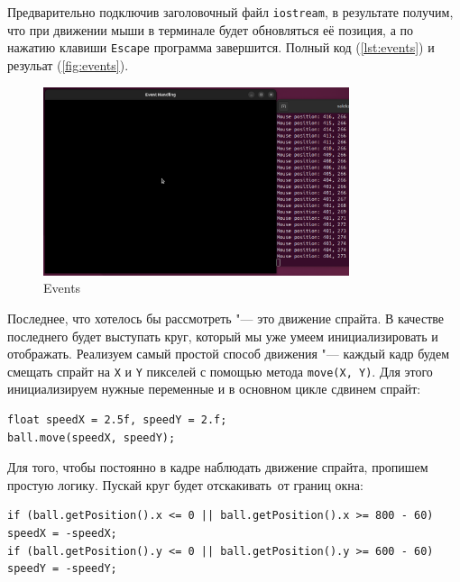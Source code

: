 Предварительно подключив заголовочный файл \texttt{iostream}, в результате получим, что при движении мыши в терминале будет обновляться её позиция, а по нажатию клавиши \texttt{Escape} программа завершится. Полный код (\autoref{lst:events}) и резульат (\autoref{fig:events}).
\begin{figure}[H]
    \centering
    \includegraphics[width=0.8\textwidth]{src/img/sfml_events.png}
    \caption{Events}
    \label{fig:events}
\end{figure}

Последнее, что хотелось бы рассмотреть "--- это движение спрайта. В качестве последнего будет выступать круг, который мы уже умеем инициализировать и отображать. Реализуем самый простой способ движения "--- каждый кадр будем смещать спрайт на \texttt{X} и \texttt{Y} пикселей с помощью метода \texttt{move(X, Y)}. Для этого инициализируем нужные переменные и в основном цикле сдвинем спрайт:

\begin{lstlisting}[style=myStyle]
float speedX = 2.5f, speedY = 2.f;
ball.move(speedX, speedY);
\end{lstlisting}

Для того, чтобы постоянно в кадре наблюдать движение спрайта, пропишем простую логику. Пускай круг будет \flqq отскакивать\frqq\ от границ окна:

\begin{lstlisting}[style=myStyle]
if (ball.getPosition().x <= 0 || ball.getPosition().x >= 800 - 60) speedX = -speedX;
if (ball.getPosition().y <= 0 || ball.getPosition().y >= 600 - 60) speedY = -speedY;
\end{lstlisting}

